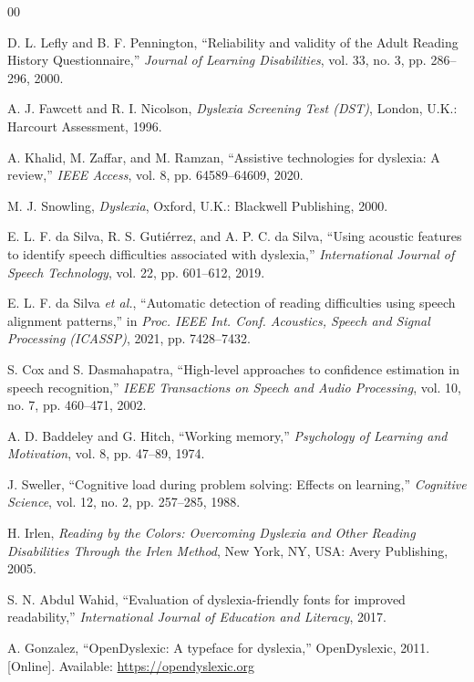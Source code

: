 \documentclass[conference]{IEEEtran}
\begin{document}
\begin{thebibliography}{00}

D. L. Lefly and B. F. Pennington,
``Reliability and validity of the Adult Reading History Questionnaire,''
\textit{Journal of Learning Disabilities}, vol. 33, no. 3, pp. 286--296, 2000.

A. J. Fawcett and R. I. Nicolson,
\textit{Dyslexia Screening Test (DST)},
London, U.K.: Harcourt Assessment, 1996.

A. Khalid, M. Zaffar, and M. Ramzan,
``Assistive technologies for dyslexia: A review,''
\textit{IEEE Access}, vol. 8, pp. 64589--64609, 2020.

M. J. Snowling,
\textit{Dyslexia},
Oxford, U.K.: Blackwell Publishing, 2000.

E. L. F. da Silva, R. S. Guti\'errez, and A. P. C. da Silva,
``Using acoustic features to identify speech difficulties associated with dyslexia,''
\textit{International Journal of Speech Technology}, vol. 22, pp. 601--612, 2019.

E. L. F. da Silva \textit{et al.},
``Automatic detection of reading difficulties using speech alignment patterns,''
in \textit{Proc. IEEE Int. Conf. Acoustics, Speech and Signal Processing (ICASSP)}, 2021, pp. 7428--7432.

S. Cox and S. Dasmahapatra,
``High-level approaches to confidence estimation in speech recognition,''
\textit{IEEE Transactions on Speech and Audio Processing}, vol. 10, no. 7, pp. 460--471, 2002.

A. D. Baddeley and G. Hitch,
``Working memory,''
\textit{Psychology of Learning and Motivation}, vol. 8, pp. 47--89, 1974.

J. Sweller,
``Cognitive load during problem solving: Effects on learning,''
\textit{Cognitive Science}, vol. 12, no. 2, pp. 257--285, 1988.

H. Irlen,
\textit{Reading by the Colors: Overcoming Dyslexia and Other Reading Disabilities Through the Irlen Method},
New York, NY, USA: Avery Publishing, 2005.

S. N. Abdul Wahid,
``Evaluation of dyslexia-friendly fonts for improved readability,''
\textit{International Journal of Education and Literacy}, 2017.

A. Gonzalez,
``OpenDyslexic: A typeface for dyslexia,''
OpenDyslexic, 2011. [Online]. Available: \url{https://opendyslexic.org}


\end{thebibliography}
\end{document}
